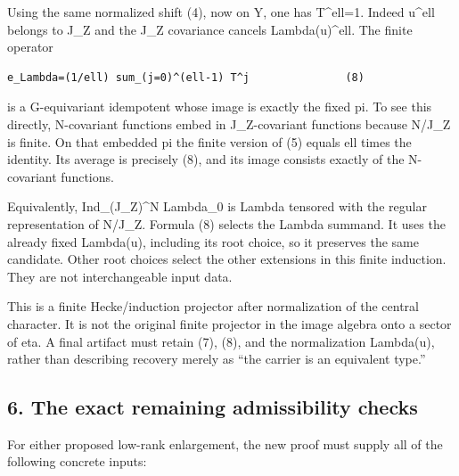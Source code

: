 Using the same normalized shift (4), now on Y, one has T\^{}ell=1.
Indeed u\^{}ell belongs to J\_Z and the J\_Z covariance cancels
Lambda(u)\^{}ell. The finite operator

\begin{Verbatim}[fontsize=\small,breaklines=true,breakanywhere=true]
e_Lambda=(1/ell) sum_(j=0)^(ell-1) T^j               (8)
\end{Verbatim}

is a G-equivariant idempotent whose image is exactly the fixed pi. To
see this directly, N-covariant functions embed in J\_Z-covariant
functions because N/J\_Z is finite. On that embedded pi the finite
version of (5) equals ell times the identity. Its average is precisely
(8), and its image consists exactly of the N-covariant functions.

Equivalently, Ind\_(J\_Z)\^{}N Lambda\_0 is Lambda tensored with the
regular representation of N/J\_Z. Formula (8) selects the Lambda summand.
It uses the already fixed Lambda(u), including its root choice, so it
preserves the same candidate. Other root choices select the other
extensions in this finite induction. They are not interchangeable input
data.

This is a finite Hecke/induction projector after normalization of the central character. It is not the original finite projector in the image algebra onto a sector of eta. A final artifact must retain (7), (8), and the
normalization Lambda(u), rather than describing recovery merely as ``the
carrier is an equivalent type.''

\hypertarget{lowrank_contract-the-exact-remaining-admissibility-checks}{%
\subsection{6. The exact remaining admissibility
checks}\label{lowrank_contract-the-exact-remaining-admissibility-checks}}

For either proposed low-rank enlargement, the new proof must supply all
of the following concrete inputs:

